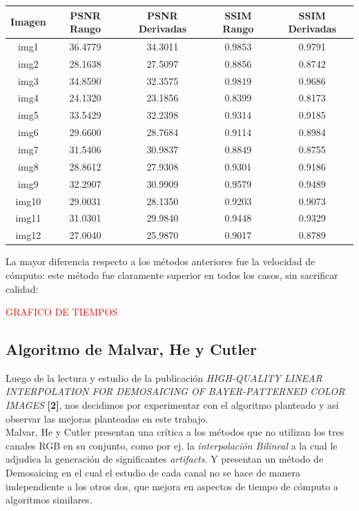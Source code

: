 \documentclass[a4paper]{article}
\begin{document}
\begin{center}
\begin{tabular}{  | c || c | c | c | c | }
 \hline
 Imagen & PSNR Rango & PSNR Derivadas & SSIM Rango & SSIM Derivadas\\
\hline
\hline
 img1 & 36.4779 & 34.3011 & 0.9853 & 0.9791\\
 \hline
 img2 & 28.1638 & 27.5097 & 0.8856 & 0.8742\\
 \hline  
  img3 & 34.8590 & 32.3575 & 0.9819 & 0.9686\\
 \hline  
  img4 & 24.1320 & 23.1856 & 0.8399 & 0.8173\\
 \hline  
  img5 & 33.5429 & 32.2398 & 0.9314 & 0.9185\\
 \hline  
  img6 & 29.6600 & 28.7684 & 0.9114 & 0.8984\\
 \hline  
  img7 & 31.5406 & 30.9837 & 0.8849 & 0.8755\\
 \hline  
  img8 & 28.8612 & 27.9308 & 0.9301 & 0.9186\\
 \hline  
  img9 & 32.2907 & 30.9909 & 0.9579 & 0.9489\\
 \hline  
  img10 & 29.0031 & 28.1350 & 0.9203 & 0.9073\\
 \hline  
  img11 & 31.0301 & 29.9840 & 0.9448 & 0.9329\\
 \hline  
  img12 & 27.0040 & 25.9870 & 0.9017 & 0.8789\\
 \hline  
\end{tabular}
\end{center}

La mayor diferencia respecto a los métodos anteriores fue la velocidad de cómputo: este método fue claramente superior en todos los casos, sin sacrificar calidad:

\textcolor{red}{GRAFICO DE TIEMPOS\\}

\newpage
\subsection{Algoritmo de Malvar, He y Cutler}

Luego de la lectura y estudio de la publicaci\'on \textit{HIGH-QUALITY LINEAR INTERPOLATION
FOR DEMOSAICING OF BAYER-PATTERNED COLOR IMAGES} \textbf{[2]}, nos decidimos por experimentar con el algoritmo planteado y as\'i observar las mejoras planteadas en este trabajo.\\

Malvar, He y Cutler presentan una cr\'itica a los m\'etodos que no utilizan los tres canales RGB en su conjunto, como por ej. la \emph{interpolaci\'on Bilineal} a la cual le adjudica la generaci\'on de significantes \textit{artifacts}. Y presentan un m\'etodo de Demosaicing en el cual el estudio de cada canal no se hace de manera independiente a los otros dos, que mejora en aspectos de tiempo de c\'omputo a algoritmos similares.\\
\end{document}
